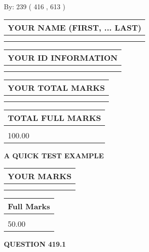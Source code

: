 \documentclass[12pt]{article}
\begin{document}
   
\hspace{1.0in} By: 
 239 ( 416 ,  613 )
   
   
   
   
\newpage 
\setcounter{page}{ 
   419001 } 
   
   
   
   
\noindent\begin{tabular}{|l|}
\hline
YOUR NAME (FIRST, ... LAST)  \\
\hline
 \\ 
 \\ 
\hline
\end{tabular}
\hspace{0.05in} \begin{tabular}{|l|}
\hline
 YOUR   ID   INFORMATION  \\
\hline
 \\ 
 \\ 
\hline
\end{tabular}
   
   
\vspace{0.2in}\noindent\begin{tabular}{|l|}
\hline
YOUR TOTAL MARKS  \\
\hline
 \\ 
 \\ 
\hline
\end{tabular}
\hspace{0.05in} \begin{tabular}{|l|}
\hline
TOTAL FULL MARKS  \\
\hline
 \\ 
100.00 \\
\hline
\end{tabular}
   
   
 \vspace{0.2in}
{\LARGE {\textbf{ A QUICK TEST EXAMPLE}}}
   
   
  
\vspace{0.2in}
  
\noindent\begin{tabular}{|l|}
\hline
 YOUR MARKS  \\
\hline
 \\ 
 \\ 
\hline
\end{tabular}
\hspace{0.05in} \begin{tabular}{|l|}
\hline
 Full Marks  \\
\hline
 \\ 
50.00 \\
\hline
\end{tabular}
{\textbf{\Large{QUESTION
419.1 
}}}
  
\end{document}
